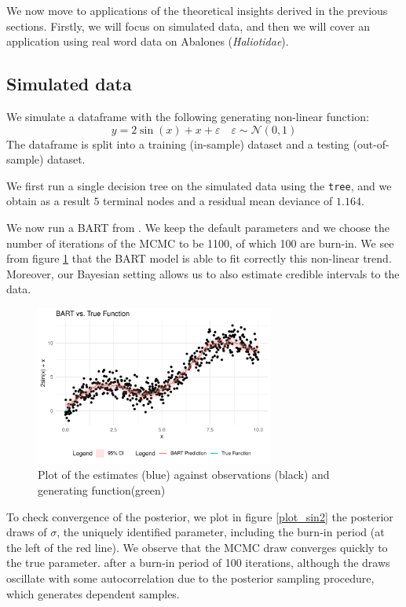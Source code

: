 \documentclass[a4paper,11pt]{article}
\begin{document}
We now move to applications of the theoretical insights derived in the previous sections. Firstly, we will focus on simulated data, and then we will cover an application using real word data on Abalones (\textit{Haliotidae}).

\subsection{Simulated data}
We simulate a dataframe with the following generating non-linear function:
\begin{equation}
  y = 2\sin(x)+x+\varepsilon \quad \varepsilon \sim \mathcal{N}(0,1)
\end{equation}
The dataframe is split into a training (in-sample) dataset and a testing (out-of-sample) dataset.

We first run a single decision tree on the simulated data using the \texttt{tree}, and we obtain as a result $5$ terminal nodes and a 
residual mean deviance of $1.164$. 

We now run a BART from \cite{chipmanBARTBayesianAdditive2010}. We keep the default parameters and we choose the number of iterations of the MCMC to be 1100, of which 100 are burn-in. We see from figure \ref{plot_sin1} that the BART model is able to fit correctly this non-linear trend. Moreover, our Bayesian setting allows us to also estimate credible intervals to the data.
\begin{figure}[h]
  \centering
  \includegraphics[width=0.7\textwidth]{outputs/sin_plot.pdf}
  \caption{Plot of the estimates (blue) against observations (black) and generating function(green)}
  \label{plot_sin1}
\end{figure}

To check convergence of the posterior, we plot in figure \ref{plot_sin2} the posterior draws of $\sigma$, the uniquely identified parameter, including the burn-in period (at the left of the red line). We observe that the MCMC draw converges quickly to the true parameter. after a burn-in period of 100 iterations, although the draws oscillate with some autocorrelation due to the posterior sampling procedure, which generates dependent samples.
\end{document}

